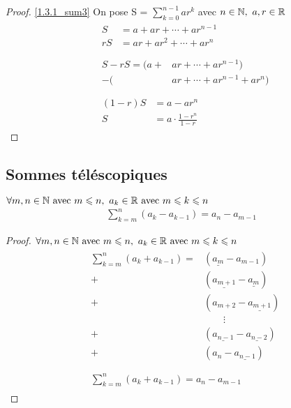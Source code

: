 \begin{proof}
	\ref{1.3.1_sum3} On pose S = $\displaystyle{\sum_{k = 0}^{n-1}ar^k}$ avec $n \in \mathbb{N},\ a, r \in \mathbb{R}$
	\begin{align*}
		&\begin{aligned}
			S &= a + ar + \cdots + ar^{n-1} \\
			rS &= ar + ar^2 + \cdots + ar^n 
		\end{aligned} 
		\\
		\\
		&\begin{aligned}
			S - rS = (a + &ar + \cdots + ar^{n-1}) \\
			- (&ar + \cdots + ar^{n-1} + ar^n)
		\end{aligned}
		\\
		\\
		&\begin{aligned}
			(1 - r)S &= a - ar^n \\
			S &= a \cdot \frac{1 - r^n}{1 - r}
		\end{aligned}
	\end{align*}
\end{proof}

\subsection{Sommes téléscopiques}

\begin{graybox}
	\begin{proposition}
		$\forall m, n \in \mathbb{N} \textnormal{ avec }m \leqslant n,\ a_{k}  \in \mathbb{R} \textnormal{ avec } m \leqslant k \leqslant n$
		\begin{align*}
			\sum_{k = m}^{n} (a_k - a_{k-1}) = a_n - a_{m - 1} 
		\end{align*}
	\end{proposition}
\end{graybox}

\begin{proof}
	$\forall m, n \in \mathbb{N} \textnormal{ avec }m \leqslant n,\ a_{k}  \in \mathbb{R} \textnormal{ avec } m \leqslant k \leqslant n$
	\begin{align*}
		&\begin{aligned}
			\sum_{k = m}^{n}(a_k + a_{k - 1}) = &(\underline{a_m} - a_{m-1}) \\
			+&(\underline{a_{m+1}} - \underline{a_m}) \\
			+&(a_{m+2} - \underline{a_{m+1}}) \\
			& \qquad \vdots \\
			+& (\underline{a_{n-1}} - \underline{a_{n-2}}) \\	
			+& (a_n - \underline{a_{n - 1}}) \\
		\end{aligned}
		\\
		&\begin{aligned}
			\sum_{k = m}^{n}(a_k + a_{k - 1}) = a_n - a_{m - 1}
		\end{aligned}
	\end{align*}
\end{proof}

